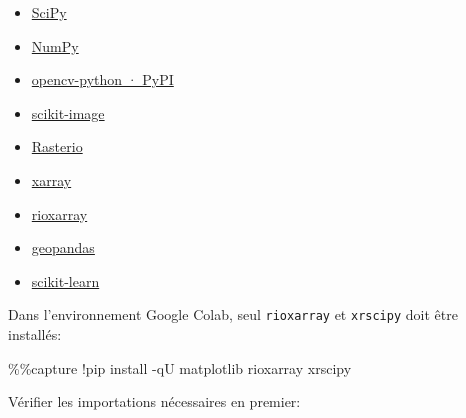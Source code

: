 \documentclass[
]{article}
\newenvironment{Shaded}{}{}
\newcommand{\NormalTok}[1]{#1}
\newcommand{\OperatorTok}[1]{\textcolor[rgb]{0.40,0.40,0.40}{#1}}
\begin{document}
\begin{itemize}
\item
  \href{https://scipy.org/}{SciPy}
\item
  \href{https://numpy.org/}{NumPy}
\item
  \href{https://pypi.org/project/opencv-python/}{opencv-python · PyPI}
\item
  \href{https://scikit-image.org/}{scikit-image}
\item
  \href{https://rasterio.readthedocs.io/en/stable/}{Rasterio}
\item
  \href{https://docs.xarray.dev/en/stable/}{xarray}
\item
  \href{https://corteva.github.io/rioxarray/stable/index.html}{rioxarray}
\item
  \href{https://geopandas.org}{geopandas}
\item
  \href{https://scikit-learn.org/}{scikit-learn}
\end{itemize}

Dans l'environnement Google Colab, seul \texttt{rioxarray} et
\texttt{xrscipy} doit être installés:

\label{3cf35c25}
\label{cb1}
\begin{Shaded}
\begin{Highlighting}[]
\OperatorTok{\%\%}\NormalTok{capture}
\OperatorTok{!}\NormalTok{pip install }\OperatorTok{{-}}\NormalTok{qU matplotlib rioxarray xrscipy}
\end{Highlighting}
\end{Shaded}

Vérifier les importations nécessaires en premier:
\end{document}
